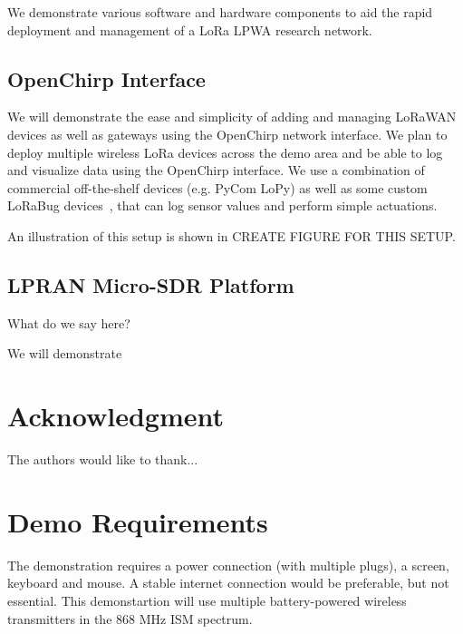 \documentclass[conference]{IEEEtran}
\begin{document}
We demonstrate various software and hardware components to aid the rapid
deployment and management of a LoRa LPWA research network.

\subsection{OpenChirp Interface}
\label{sec:oc-interface-demo}

We will demonstrate the ease and simplicity of adding and managing LoRaWAN
devices as well as gateways using the OpenChirp network interface. We plan to
deploy multiple wireless LoRa devices across the demo area and be able to log
and visualize data using the OpenChirp interface. We use a combination of
commercial off-the-shelf devices (e.g. PyCom LoPy) as well as some custom
LoRaBug devices~\cite{dongare2017openchirp}, that can log sensor values and
perform simple actuations.

An illustration of this setup is shown in {\color{red} CREATE FIGURE FOR THIS
SETUP}.

\subsection{LPRAN Micro-SDR Platform}
\label{sec:lpran-demo}

What do we say here?

We will demonstrate


\section*{Acknowledgment}


The authors would like to thank...


\balance


\section{Demo Requirements}
\label{sec:requirements}

The demonstration requires a power connection (with multiple plugs), a screen,
keyboard and mouse. A stable internet connection would be preferable, but not
essential. This demonstartion will use multiple battery-powered wireless
transmitters in the 868 MHz ISM spectrum.
\end{document}
